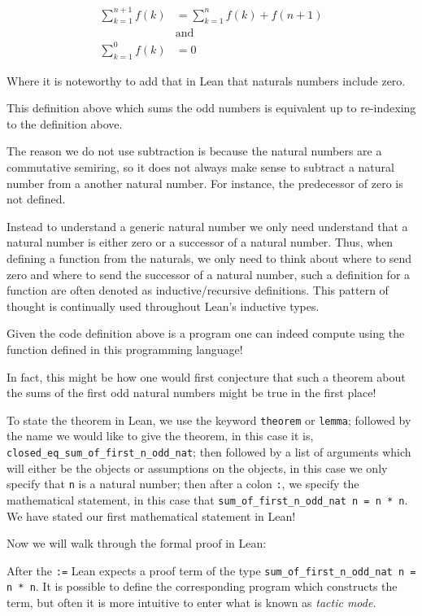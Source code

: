 \begin{example}
    \begin{align*}
        \sum_{k = 1}^{n + 1} f(k) &= \sum_{k = 1}^{n} f(k) + f(n + 1) \tag{for $n \geq 0$}\\
            &\text{and}\\
        \sum_{k = 1}^{0} f(k) &= 0
    \end{align*}

    Where it is noteworthy to add that in Lean that naturals numbers include zero.

    This definition above which sums the odd numbers is equivalent up to re-indexing to the definition above. 
    
    The reason we do not use subtraction is because the natural numbers are a commutative semiring, so 
    it does not always make sense to subtract a natural number from a another natural number. For instance, the predecessor of
    zero is not defined. 
    
    Instead to understand a generic natural number we only need understand that a natural number is either zero or a successor of a natural number.
    Thus, when defining a function from the naturals,
    we only need to think about where to send zero and where to send the successor of a natural number, such a definition for a function
    are often denoted as inductive/recursive definitions. This pattern of thought is continually used throughout Lean's inductive types.

    Given the code definition above is a program one can indeed compute using the
    function defined in this programming language!

    In fact, this might be how one would first conjecture that such a theorem about 
    the sums of the first odd natural numbers might be true in the first place!

    To state the theorem in Lean, we use the keyword \texttt{theorem} or \texttt{lemma};
    followed by the name we would like to give the theorem, in this case it is, \texttt{closed\_eq\_sum\_of\_first\_n\_odd\_nat};
    then followed by a list of arguments which will either be the objects or assumptions on the objects, in this case we only
    specify that \texttt{n} is a natural number; then after a colon \texttt{:}, we specify the mathematical statement,
    in this case that \texttt{sum\_of\_first\_n\_odd\_nat n = n * n}. We have stated our first mathematical statement in Lean!

    Now we will walk through the formal proof in Lean:

    After the \texttt{:=} Lean expects a proof term of the type \texttt{sum\_of\_first\_n\_odd\_nat n = n * n}. It is possible to
    define the corresponding program which constructs the term, but often it is more intuitive to enter what is known as \textit{tactic mode}.


\end{example}
